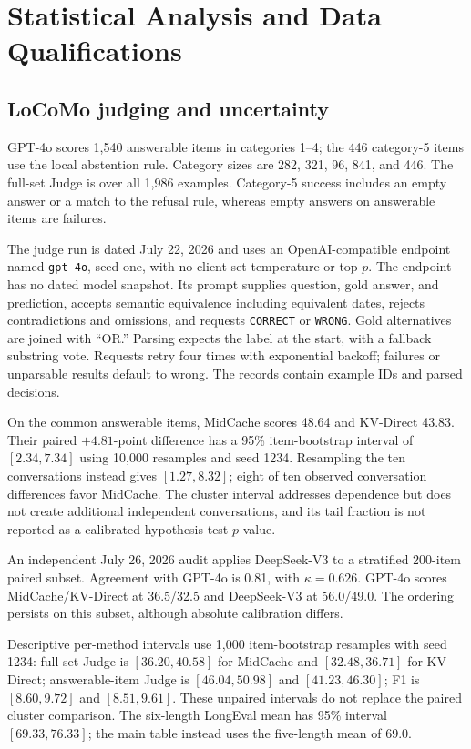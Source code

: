 \FloatBarrier
\section{Statistical Analysis and Data Qualifications}
\label{app:stats}
\subsection{LoCoMo judging and uncertainty}
GPT-4o scores 1,540 answerable items in categories 1--4; the 446 category-5 items use the local abstention rule. Category sizes are 282, 321, 96, 841, and 446. The full-set Judge is over all 1,986 examples. Category-5 success includes an empty answer or a match to the refusal rule, whereas empty answers on answerable items are failures.

The judge run is dated July 22, 2026 and uses an OpenAI-compatible endpoint named \texttt{gpt-4o}, seed one, with no client-set temperature or top-$p$. The endpoint has no dated model snapshot. Its prompt supplies question, gold answer, and prediction, accepts semantic equivalence including equivalent dates, rejects contradictions and omissions, and requests \texttt{CORRECT} or \texttt{WRONG}. Gold alternatives are joined with ``OR.'' Parsing expects the label at the start, with a fallback substring vote. Requests retry four times with exponential backoff; failures or unparsable results default to wrong. The records contain example IDs and parsed decisions.

On the common answerable items, MidCache scores 48.64 and KV-Direct 43.83. Their paired $+4.81$-point difference has a 95\% item-bootstrap interval of $[2.34,7.34]$ using 10,000 resamples and seed 1234. Resampling the ten conversations instead gives $[1.27,8.32]$; eight of ten observed conversation differences favor MidCache. The cluster interval addresses dependence but does not create additional independent conversations, and its tail fraction is not reported as a calibrated hypothesis-test $p$ value.

An independent July 26, 2026 audit applies DeepSeek-V3 to a stratified 200-item paired subset. Agreement with GPT-4o is 0.81, with $\kappa=0.626$. GPT-4o scores MidCache/KV-Direct at 36.5/32.5 and DeepSeek-V3 at 56.0/49.0. The ordering persists on this subset, although absolute calibration differs.

Descriptive per-method intervals use 1,000 item-bootstrap resamples with seed 1234: full-set Judge is $[36.20,40.58]$ for MidCache and $[32.48,36.71]$ for KV-Direct; answerable-item Judge is $[46.04,50.98]$ and $[41.23,46.30]$; F1 is $[8.60,9.72]$ and $[8.51,9.61]$. These unpaired intervals do not replace the paired cluster comparison. The six-length LongEval mean has 95\% interval $[69.33,76.33]$; the main table instead uses the five-length mean of 69.0.

